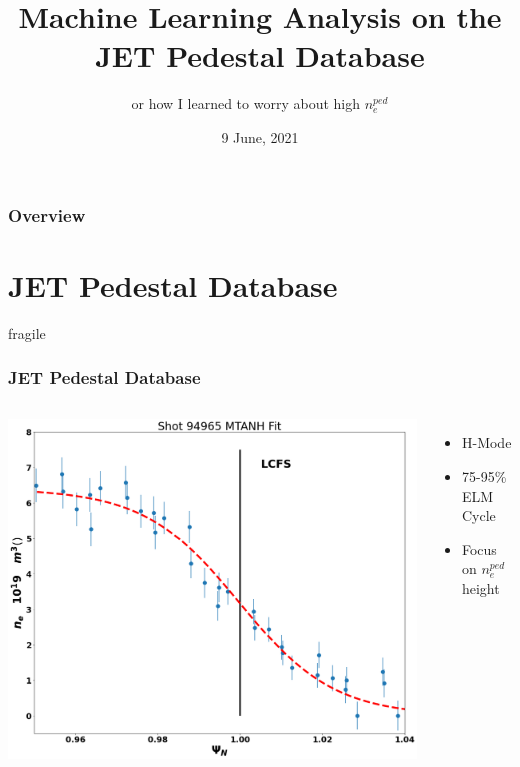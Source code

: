 \documentclass{beamer}
\title{Machine Learning Analysis on the JET Pedestal Database}
\subtitle{or how I learned to worry about high  $n_e^{ped}$}
\date{9 June, 2021}
\begin{document}
\frame{\titlepage}


\begin{frame}
	\frametitle{Overview}
	\tableofcontents
\end{frame}

\section{JET Pedestal Database}
\begin{frame}{fragile}
\frametitle{JET Pedestal Database}
\begin{columns}

\includegraphics[scale=0.2]{../src/MTANH_fit}\hfill
{}
\begin{itemize}
	\item H-Mode 
	\item 75-95\% ELM Cycle
	\item Focus on $n_e^{ped}$ height
\end{itemize}
\end{columns}

\end{frame}
\end{document}
